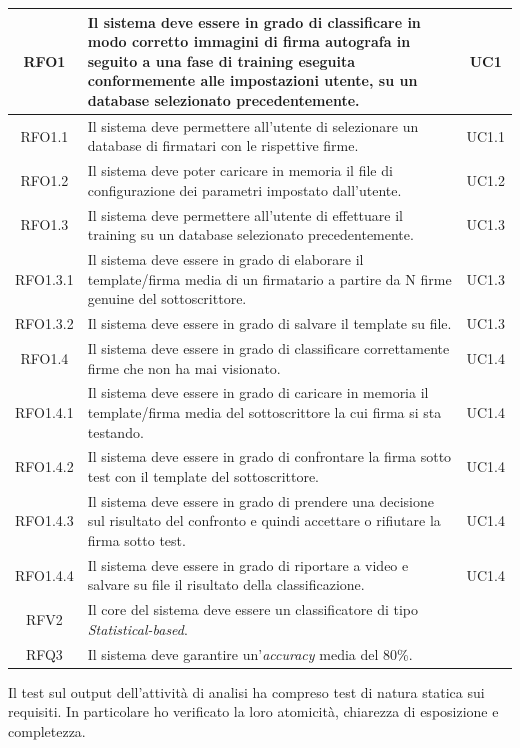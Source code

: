 \begin{longtable}{|c|p{9cm}|c|}
\midrule
RFO1
& Il sistema deve essere in grado di classificare in modo corretto immagini di firma autografa in seguito a una fase di training eseguita conformemente alle impostazioni utente, su un database selezionato precedentemente.
& UC1
\\
\midrule
RFO1.1
& Il sistema deve permettere all'utente di selezionare un database di firmatari con le rispettive firme.
& UC1.1
\\
\midrule
RFO1.2
& Il sistema deve poter caricare in memoria il file di configurazione dei parametri impostato dall'utente.
& UC1.2
\\
\midrule
RFO1.3
&  Il sistema deve permettere all'utente di effettuare il training su un database selezionato precedentemente.
& UC1.3
\\
\midrule
RFO1.3.1
& Il sistema deve essere in grado di elaborare il template/firma media di un firmatario a partire da N firme genuine del sottoscrittore.
& UC1.3
\\
\midrule
RFO1.3.2
& Il sistema deve essere in grado di salvare il template su file.
& UC1.3
\\
\midrule
RFO1.4
& Il sistema deve essere in grado di classificare correttamente firme che non ha mai visionato.
& UC1.4
\\
\midrule
RFO1.4.1
& Il sistema deve essere in grado di caricare in memoria il template/firma media del sottoscrittore la cui firma si sta testando.
& UC1.4
\\
\midrule
RFO1.4.2
& Il sistema deve essere in grado di confrontare la firma sotto test con il template del sottoscrittore.
& UC1.4
\\
\midrule
RFO1.4.3
& Il sistema deve essere in grado di prendere una decisione sul risultato del confronto e quindi accettare o rifiutare la firma sotto test.
& UC1.4
\\
\midrule
RFO1.4.4
& Il sistema deve essere in grado di riportare a video e salvare su file il risultato della classificazione.
& UC1.4
\\
\midrule
RFV2
& Il core del sistema deve essere un classificatore di tipo \emph{Statistical-based}.
&
\\
\midrule
RFQ3
& Il sistema deve garantire un'\emph{accuracy} media del 80\%.
& 
\end{longtable}
Il test sul output dell'attività di analisi ha compreso test di natura statica sui requisiti. In particolare ho verificato la loro atomicità, chiarezza di esposizione e completezza.\\\\

